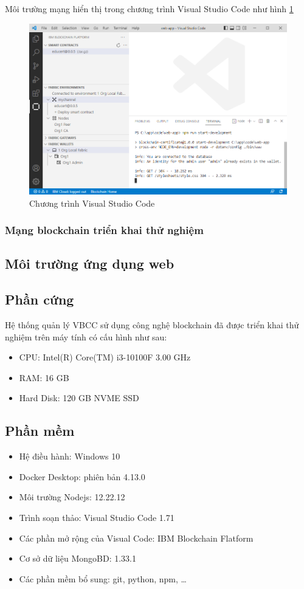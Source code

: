 Môi trường mạng hiển thị trong chương trình Visual Studio Code như hình \ref{fig:ide_start}
\begin{figure}[htbp]
\centering
\includegraphics[width=.9\linewidth]{img/ide_start.PNG}
\caption{Chương trình Visual Studio Code}
\label{fig:ide_start}
\end{figure}

\subsubsection{Mạng blockchain triển khai thử nghiệm}

\subsection{Môi trường ứng dụng web}

\subsection{Phần cứng}

Hệ thống quản lý VBCC sử dụng công nghệ blockchain đã được triển khai thử nghiệm trên máy tính có cấu hình như sau:
\begin{itemize}
\item CPU: Intel(R) Core(TM) i3-10100F 3.00 GHz
\item RAM: 16 GB
\item Hard Disk: 120 GB NVME SSD
\end{itemize}

\subsection{Phần mềm}
\begin{itemize}
\item Hệ điều hành: Windows 10
\item Docker Desktop: phiên bản 4.13.0
\item Môi trường Nodejs: 12.22.12
\item Trình soạn thảo: Visual Studio Code 1.71
\item Các phần mở rộng của Visual Code: IBM Blockchain Flatform
\item Cơ sở dữ liệu MongoBD: 1.33.1
\item Các phần mềm bổ sung: git, python, npm, \ldots
\end{itemize}

